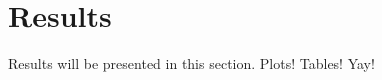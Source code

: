 \section{Results}
\label{sec:results}

Results will be presented in this section. Plots! Tables! Yay!


